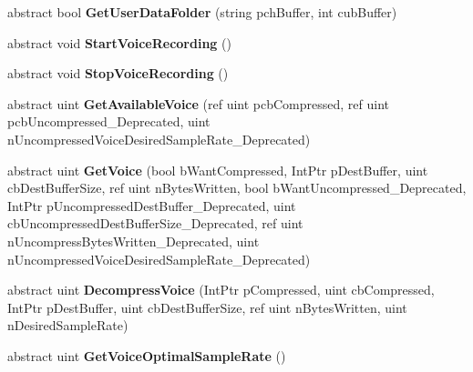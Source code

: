 \begin{DoxyCompactItemize}
abstract bool {\bfseries Get\+User\+Data\+Folder} (string pch\+Buffer, int cub\+Buffer)
\item 
\mbox{\label{class_valve_1_1_steamworks_1_1_i_steam_user_a06b25883eaf14b74baac82a5cc1267ba}} 
abstract void {\bfseries Start\+Voice\+Recording} ()
\item 
\mbox{\label{class_valve_1_1_steamworks_1_1_i_steam_user_a5dda1c2673d924716fe8a7ba4546ce32}} 
abstract void {\bfseries Stop\+Voice\+Recording} ()
\item 
\mbox{\label{class_valve_1_1_steamworks_1_1_i_steam_user_a82b3d122ea8fd427f681fa1694d10648}} 
abstract uint {\bfseries Get\+Available\+Voice} (ref uint pcb\+Compressed, ref uint pcb\+Uncompressed\+\_\+\+Deprecated, uint n\+Uncompressed\+Voice\+Desired\+Sample\+Rate\+\_\+\+Deprecated)
\item 
\mbox{\label{class_valve_1_1_steamworks_1_1_i_steam_user_ad0386595de00338bce6a3e5af4b0d468}} 
abstract uint {\bfseries Get\+Voice} (bool b\+Want\+Compressed, Int\+Ptr p\+Dest\+Buffer, uint cb\+Dest\+Buffer\+Size, ref uint n\+Bytes\+Written, bool b\+Want\+Uncompressed\+\_\+\+Deprecated, Int\+Ptr p\+Uncompressed\+Dest\+Buffer\+\_\+\+Deprecated, uint cb\+Uncompressed\+Dest\+Buffer\+Size\+\_\+\+Deprecated, ref uint n\+Uncompress\+Bytes\+Written\+\_\+\+Deprecated, uint n\+Uncompressed\+Voice\+Desired\+Sample\+Rate\+\_\+\+Deprecated)
\item 
\mbox{\label{class_valve_1_1_steamworks_1_1_i_steam_user_ac9b710ab3abc47b2ef716bba4b3a70cd}} 
abstract uint {\bfseries Decompress\+Voice} (Int\+Ptr p\+Compressed, uint cb\+Compressed, Int\+Ptr p\+Dest\+Buffer, uint cb\+Dest\+Buffer\+Size, ref uint n\+Bytes\+Written, uint n\+Desired\+Sample\+Rate)
\item 
\mbox{\label{class_valve_1_1_steamworks_1_1_i_steam_user_a76dc681a9b91fb29726b302763edfe04}} 
abstract uint {\bfseries Get\+Voice\+Optimal\+Sample\+Rate} ()
\item 
\mbox{\label{class_valve_1_1_steamworks_1_1_i_steam_user_a3e56f6ab9c27dd10b6f79b04f63fe0ad}} 

\end{DoxyCompactItemize}

